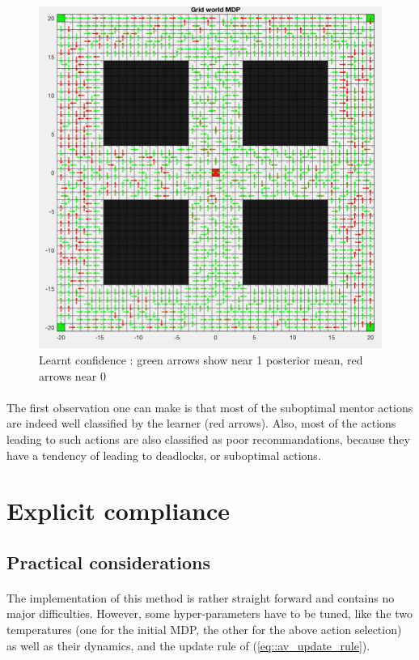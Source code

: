 \documentclass[a4paper]{report}
\begin{document}
{{{{\begin{figure}[ht!]
\begin{minipage}{0.5\linewidth}
						\begin{center}
							\includegraphics[width=0.95\linewidth]{heatmap_confidence_50}
							\caption{Learnt confidence : green arrows show near 1 posterior mean, red arrows near 0}
							\label{fig::heatmap_confidence_50}
						\end{center}
					\end{minipage}
				\end{figure}
				
				\paragraph{} The first observation one can make is that most of the suboptimal mentor actions are indeed well classified by the learner (red arrows). Also, most of the actions leading to such actions are also classified as poor recommandations, because they have a tendency of leading to deadlocks, or suboptimal actions.  
			}
		}
		\section{Explicit compliance}
		{
		
			\subsection{Practical considerations}
			{
				\paragraph{} The implementation of this method is rather straight forward and contains no major difficulties. However, some hyper-parameters have to be tuned, like the two temperatures (one for the initial MDP, the other for the above action selection) as well as their dynamics, and the update rule of (\ref{eq::av_update_rule}). 
				
}}}}
\end{document}
